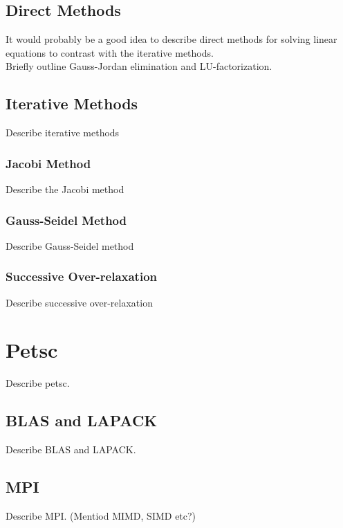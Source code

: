 \subsection*{Direct Methods}

It would probably be a good idea to describe direct methods for solving linear equations to contrast with the iterative methods. \\
Briefly outline Gauss-Jordan elimination and LU-factorization. 

\subsection*{Iterative Methods}

Describe iterative methods

\subsubsection*{Jacobi Method}

Describe the Jacobi method

\subsubsection*{Gauss-Seidel Method}

Describe Gauss-Seidel method

\subsubsection*{Successive Over-relaxation}

Describe successive over-relaxation

\section*{Petsc}

Describe petsc.

\subsection*{BLAS and LAPACK}

Describe BLAS and LAPACK.

\subsection*{MPI}

Describe MPI. (Mentiod MIMD, SIMD etc?)


